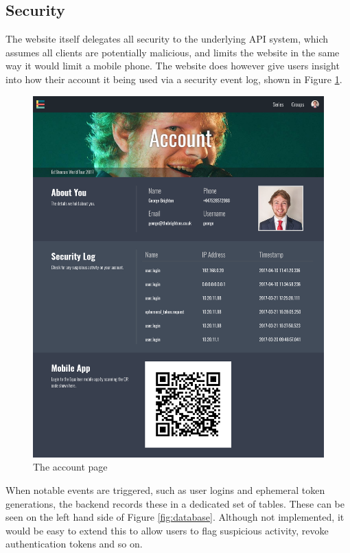 \documentclass[12pt,a4paper]{bhamdissertation}
\begin{document}
\subsection{Security}

The website itself delegates all security to the underlying API system, which assumes all clients are potentially malicious, and limits the website in the same way it would limit a mobile phone. The website does however give users insight into how their account it being used via a security event log, shown in Figure \ref{img:account}.

\begin{figure}[!htbp]
    \centering
    \includegraphics[width=1\linewidth]{img/account.png}
    \caption{The account page}
    \label{img:account}
\end{figure}

When notable events are triggered, such as user logins and ephemeral token generations, the backend records these in a dedicated set of tables. These can be seen on the left hand side of Figure \ref{fig:database}. Although not implemented, it would be easy to extend this to allow users to flag suspicious activity, revoke authentication tokens and so on.
\end{document}
